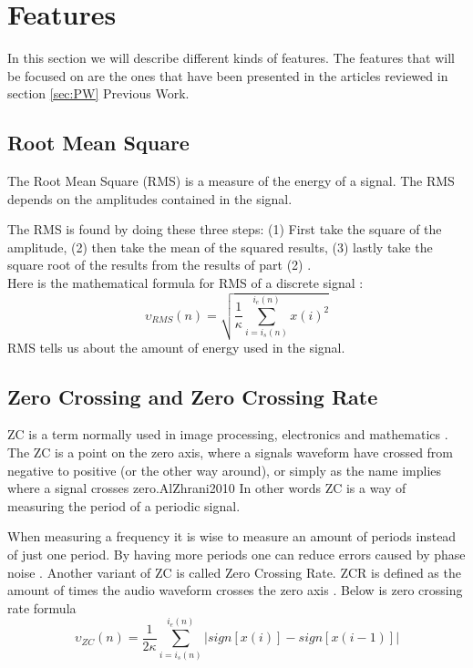 \section{Features}
In this section we will describe different kinds of features. The features that will be focused on are the ones that have been presented in the articles reviewed in section \ref{sec:PW} Previous Work.

\subsection{Root Mean Square}
The Root Mean Square (RMS) is a measure of the energy of a signal. The RMS depends on the amplitudes contained in the signal.


The RMS is found by doing these three steps:
(1) First take the square of the amplitude, (2) then take the mean of the squared results, (3) lastly take the square root of the results from the results of part (2) \citep{Bird2007}. \\ Here is the mathematical formula for RMS of a discrete signal \citep{ACA}:
\begin{equation}\label{eq:RMS formular}
\upsilon_{RMS}(n) = \sqrt{\frac{1}{\kappa}\sum_{i=i_s(n)}^{i_e(n)} x(i)^2}
\end{equation}
RMS tells us about the amount of energy used in the signal.

\subsection{Zero Crossing and Zero Crossing Rate}
ZC is a term normally used in image processing, electronics and mathematics \citep{AlZhrani2010}. The ZC is a point on the zero axis, where a signals waveform have crossed from negative to positive (or the other way around), or simply as the name implies where a signal crosses zero.{AlZhrani2010}
In other words ZC is a way of measuring the period of a periodic signal\citep{RWW2012}.


When measuring a frequency it is wise to measure an amount of periods instead of just one period. By having more periods one can reduce errors caused by phase noise \citep{RWW2012}.
Another variant of ZC is called Zero Crossing Rate. ZCR is defined as the amount of times the audio waveform crosses the zero axis \citep{DSShete}.
Below is zero crossing rate formula \citep{ACA} 
\begin{equation}\label{eq:ZCR}
\upsilon_{ZC}(n)= \frac{1}{2 \kappa}\sum_{i=i_s(n)}^{i_e (n)}|sign[x(i)]-sign[x(i-1)]|
\end{equation}

